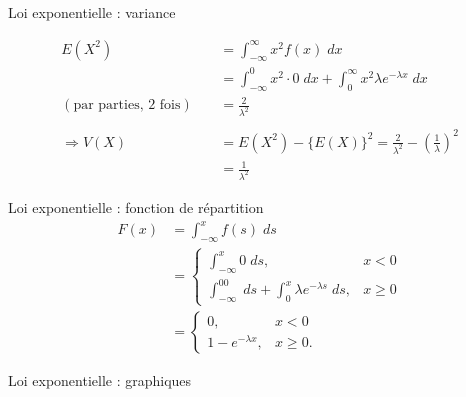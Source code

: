 \documentclass{BeamerTemplate}
\begin{document}
\begin{frame}[t]{Loi exponentielle : variance}

{\small
\begin{align*}
E(X^2)&=\int_{-\infty}^\infty x^2f(x)\;dx\\
&=\int_{-\infty}^0 x^2\cdot 0\;dx
+\int_0^\infty x^2\lambda e^{-\lambda x}\;dx\\
(\text{par parties, 2 fois})\ \ \ \ \ &=\frac{2}{\lambda^2}\\
&\ \ \\
\Rightarrow
V(X)&=E(X^2)-\{E(X)\}^2=\frac{2}{\lambda^2}-\left(\frac{1}{\lambda}\right)^2\\
&=\frac{1}{\lambda^2}
\end{align*}
}
\end{frame}


\begin{frame}[t]{Loi exponentielle : fonction de répartition}
\begin{align*}
F(x)&=\int_{-\infty}^xf(s)\;ds\\[10pt]
&=\left\{\begin{array}{ll}
\int_{-\infty}^x0\;ds, & x<0\\[6pt]
\int_{-\infty}^00\;ds+\int_0^x\lambda e^{-\lambda s}\;ds, & x\ge0
\end{array}\right.\\[10pt]
&=\left\{\begin{array}{ll}
0, & x<0\\[6pt]
1-e^{-\lambda x},  & x\ge0.
\end{array}\right.
\end{align*}
\end{frame}


\begin{frame}{Loi exponentielle : graphiques}

\begin{center}
\end{center}

\end{frame}
\end{document}
